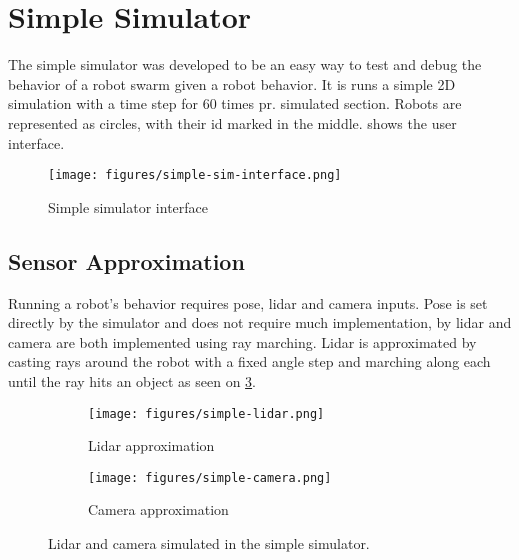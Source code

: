 \section{Simple Simulator}
The simple simulator was developed to be an easy way to test and debug the behavior of a robot swarm given a robot behavior. It is runs a simple 2D simulation with a time step for 60 times pr. simulated section. Robots are represented as circles, with their id marked in the middle.  shows the user interface.

\begin{figure}
    \begin{center}
        \texttt{[image: figures/simple-sim-interface.png]}
    \end{center}
    \caption{Simple simulator interface}\label{fig:simple-sim-interface}
\end{figure}


\subsection{Sensor Approximation}
Running a robot's behavior requires pose, lidar and camera inputs. Pose is set directly by the simulator and does not require much implementation, by lidar and camera are both implemented using {\color{red} ray marching}. Lidar is approximated by casting rays around the robot with a fixed angle step and marching along each until the ray hits an object as seen on \cref{fig:lidar-approximation}.


\begin{figure}
    \centering

    \begin{subfigure}[b]{0.45\textwidth}
        \centering
        \texttt{[image: figures/simple-lidar.png]}
        \caption{Lidar approximation}
        \label{fig:lidar-approximation}
    \end{subfigure}
    \begin{subfigure}[b]{0.45\textwidth}
        \centering
        \texttt{[image: figures/simple-camera.png]}
        \caption{Camera approximation}
        \label{fig:lidar-approximation}
    \end{subfigure}

    \caption{Lidar and camera simulated in the simple simulator.}\label{fig:sensor-approximation}
\end{figure}



